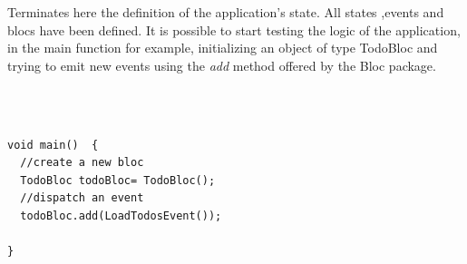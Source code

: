 Terminates here the definition of the application’s state. All states ,events and blocs have been defined. It is possible to start testing the logic of the application, in the main function for example, initializing an object of type TodoBloc and trying to emit new events using the \textit{add} method offered by the Bloc package.
\begin{code}
\mbox{}\\
 \mbox{}
\label{code:2.14}
\begin{verbatim}

void main()  {
  //create a new bloc
  TodoBloc todoBloc= TodoBloc();
  //dispatch an event
  todoBloc.add(LoadTodosEvent());
  
}
\end{verbatim}
\mbox{}
\end{code}

